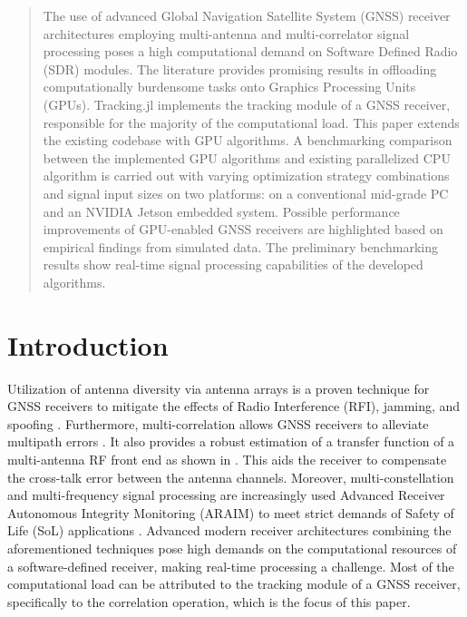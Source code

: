 \documentclass{juliacon}
\begin{document}


\maketitle

\begin{abstract}

    The use of advanced Global Navigation Satellite System (GNSS) receiver architectures employing multi-antenna and multi-correlator signal processing poses a high computational demand on Software Defined Radio (SDR) modules.
    The literature provides promising results in offloading computationally burdensome tasks onto Graphics Processing Units (GPUs). Tracking.jl implements the tracking module of a GNSS receiver, responsible for the majority of the computational load. This paper extends the existing codebase with GPU algorithms. A benchmarking comparison between the implemented GPU algorithms and existing parallelized CPU algorithm is carried out with varying optimization strategy combinations and signal input sizes on two platforms: on a conventional mid-grade PC and an NVIDIA Jetson embedded system. Possible performance improvements of GPU-enabled GNSS receivers are highlighted based on empirical findings from simulated data. The preliminary benchmarking results show real-time signal processing capabilities of the developed algorithms.

\end{abstract}

\section{Introduction}\label{sec:introduction}
Utilization of antenna diversity via antenna arrays is a proven technique for GNSS receivers to mitigate the effects of Radio Interference (RFI), jamming, and spoofing \cite{Moelker96}. Furthermore, multi-correlation allows GNSS receivers to alleviate multipath errors \cite{Nee1992}. It also provides a robust estimation of a transfer function of a multi-antenna RF front end as shown in \cite{Niestroj2018}. This aids the receiver to compensate the cross-talk error between the antenna channels. Moreover, multi-constellation and multi-frequency signal processing are increasingly used Advanced Receiver Autonomous Integrity Monitoring (ARAIM) to meet strict demands of Safety of Life (SoL) applications \cite{Blanch2013}. Advanced modern receiver architectures combining the aforementioned techniques pose high demands on the computational resources of a software-defined receiver, making real-time processing a challenge. Most of the computational load can be attributed to the tracking module of a GNSS receiver, specifically to the correlation operation, which is the focus of this paper. 
\end{document}
